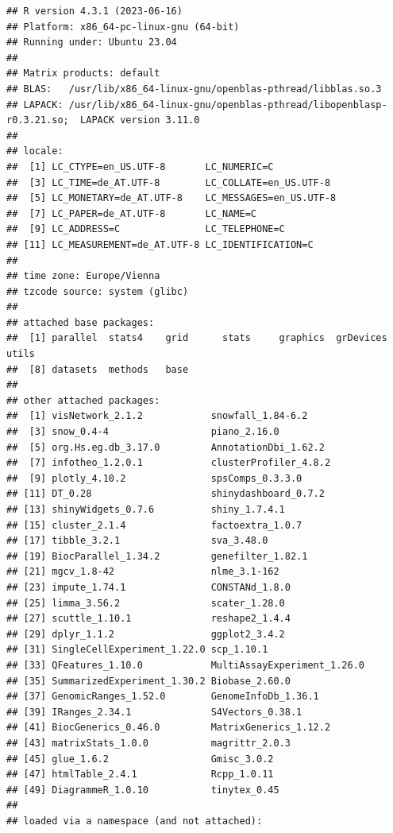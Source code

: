 \documentclass[
  11pt,
]{article}
\begin{document}
\begin{verbatim}
## R version 4.3.1 (2023-06-16)
## Platform: x86_64-pc-linux-gnu (64-bit)
## Running under: Ubuntu 23.04
## 
## Matrix products: default
## BLAS:   /usr/lib/x86_64-linux-gnu/openblas-pthread/libblas.so.3 
## LAPACK: /usr/lib/x86_64-linux-gnu/openblas-pthread/libopenblasp-r0.3.21.so;  LAPACK version 3.11.0
## 
## locale:
##  [1] LC_CTYPE=en_US.UTF-8       LC_NUMERIC=C              
##  [3] LC_TIME=de_AT.UTF-8        LC_COLLATE=en_US.UTF-8    
##  [5] LC_MONETARY=de_AT.UTF-8    LC_MESSAGES=en_US.UTF-8   
##  [7] LC_PAPER=de_AT.UTF-8       LC_NAME=C                 
##  [9] LC_ADDRESS=C               LC_TELEPHONE=C            
## [11] LC_MEASUREMENT=de_AT.UTF-8 LC_IDENTIFICATION=C       
## 
## time zone: Europe/Vienna
## tzcode source: system (glibc)
## 
## attached base packages:
##  [1] parallel  stats4    grid      stats     graphics  grDevices utils    
##  [8] datasets  methods   base     
## 
## other attached packages:
##  [1] visNetwork_2.1.2            snowfall_1.84-6.2          
##  [3] snow_0.4-4                  piano_2.16.0               
##  [5] org.Hs.eg.db_3.17.0         AnnotationDbi_1.62.2       
##  [7] infotheo_1.2.0.1            clusterProfiler_4.8.2      
##  [9] plotly_4.10.2               spsComps_0.3.3.0           
## [11] DT_0.28                     shinydashboard_0.7.2       
## [13] shinyWidgets_0.7.6          shiny_1.7.4.1              
## [15] cluster_2.1.4               factoextra_1.0.7           
## [17] tibble_3.2.1                sva_3.48.0                 
## [19] BiocParallel_1.34.2         genefilter_1.82.1          
## [21] mgcv_1.8-42                 nlme_3.1-162               
## [23] impute_1.74.1               CONSTANd_1.8.0             
## [25] limma_3.56.2                scater_1.28.0              
## [27] scuttle_1.10.1              reshape2_1.4.4             
## [29] dplyr_1.1.2                 ggplot2_3.4.2              
## [31] SingleCellExperiment_1.22.0 scp_1.10.1                 
## [33] QFeatures_1.10.0            MultiAssayExperiment_1.26.0
## [35] SummarizedExperiment_1.30.2 Biobase_2.60.0             
## [37] GenomicRanges_1.52.0        GenomeInfoDb_1.36.1        
## [39] IRanges_2.34.1              S4Vectors_0.38.1           
## [41] BiocGenerics_0.46.0         MatrixGenerics_1.12.2      
## [43] matrixStats_1.0.0           magrittr_2.0.3             
## [45] glue_1.6.2                  Gmisc_3.0.2                
## [47] htmlTable_2.4.1             Rcpp_1.0.11                
## [49] DiagrammeR_1.0.10           tinytex_0.45               
## 
## loaded via a namespace (and not attached):

\end{verbatim}
\end{document}
